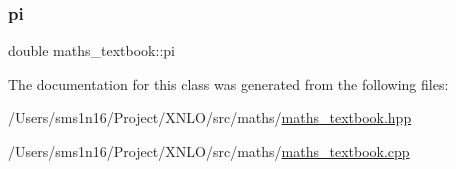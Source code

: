 \subsubsection{\texorpdfstring{pi}{pi}}
{\footnotesize\ttfamily double maths\+\_\+textbook\+::pi}



The documentation for this class was generated from the following files\+:\begin{DoxyCompactItemize}
\item 
/\+Users/sms1n16/\+Project/\+X\+N\+L\+O/src/maths/\hyperlink{maths__textbook_8hpp}{maths\+\_\+textbook.\+hpp}\item 
/\+Users/sms1n16/\+Project/\+X\+N\+L\+O/src/maths/\hyperlink{maths__textbook_8cpp}{maths\+\_\+textbook.\+cpp}\end{DoxyCompactItemize}
